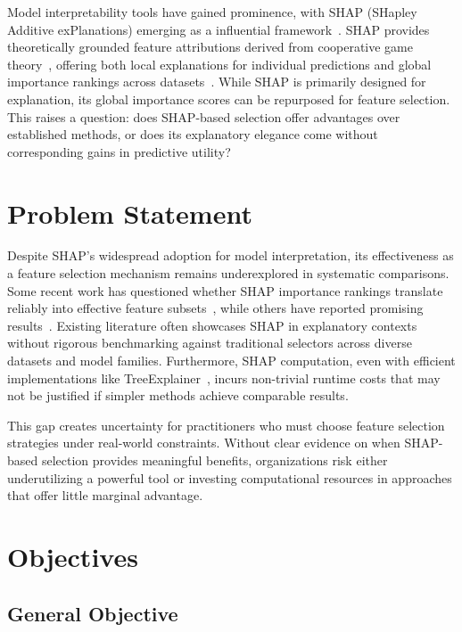 Model interpretability tools have gained prominence, with SHAP (SHapley Additive exPlanations) emerging as a influential framework~\cite{lundberg2020local}. SHAP provides theoretically grounded feature attributions derived from cooperative game theory~\cite{shapley1953value}, offering both local explanations for individual predictions and global importance rankings across datasets~\cite{fryer2021shapley}. While SHAP is primarily designed for explanation, its global importance scores can be repurposed for feature selection. This raises a question: does SHAP-based selection offer advantages over established methods, or does its explanatory elegance come without corresponding gains in predictive utility?

\section{Problem Statement}

Despite SHAP's widespread adoption for model interpretation, its effectiveness as a feature selection mechanism remains underexplored in systematic comparisons. Some recent work has questioned whether SHAP importance rankings translate reliably into effective feature subsets~\cite{wang2024feature}, while others have reported promising results~\cite{marcilio2020explanations}. Existing literature often showcases SHAP in explanatory contexts without rigorous benchmarking against traditional selectors across diverse datasets and model families. Furthermore, SHAP computation, even with efficient implementations like TreeExplainer~\cite{lundberg2020local}, incurs non-trivial runtime costs that may not be justified if simpler methods achieve comparable results.

This gap creates uncertainty for practitioners who must choose feature selection strategies under real-world constraints. Without clear evidence on when SHAP-based selection provides meaningful benefits, organizations risk either underutilizing a powerful tool or investing computational resources in approaches that offer little marginal advantage.

\section{Objectives}

\subsection{General Objective}

